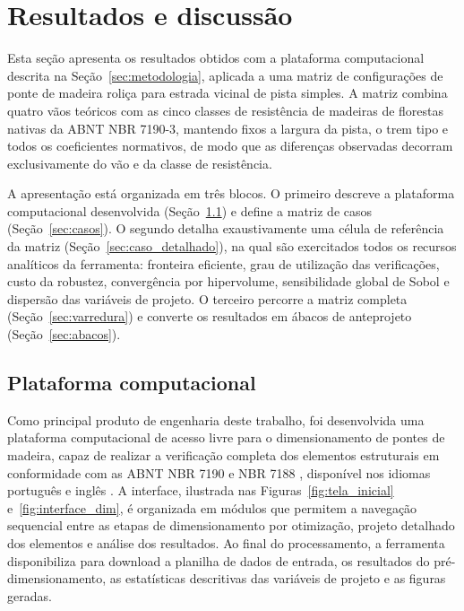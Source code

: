 \section{Resultados e discussão}\label{sec:resultados}

Esta seção apresenta os resultados obtidos com a plataforma computacional descrita na Seção~\ref{sec:metodologia}, aplicada a uma matriz de configurações de ponte de madeira roliça para estrada vicinal de pista simples.
A matriz combina quatro vãos teóricos com as cinco classes de resistência de madeiras de florestas nativas da ABNT NBR 7190-3, mantendo fixos a largura da pista, o trem tipo e todos os coeficientes normativos, de modo que as diferenças observadas decorram exclusivamente do vão e da classe de resistência.

A apresentação está organizada em três blocos.
O primeiro descreve a plataforma computacional desenvolvida (Seção~\ref{sec:plataforma}) e define a matriz de casos (Seção~\ref{sec:casos}).
O segundo detalha exaustivamente uma célula de referência da matriz (Seção~\ref{sec:caso_detalhado}), na qual são exercitados todos os recursos analíticos da ferramenta: fronteira eficiente, grau de utilização das verificações, custo da robustez, convergência por hipervolume, sensibilidade global de Sobol e dispersão das variáveis de projeto.
O terceiro percorre a matriz completa (Seção~\ref{sec:varredura}) e converte os resultados em ábacos de anteprojeto (Seção~\ref{sec:abacos}).


\subsection{Plataforma computacional}\label{sec:plataforma}

Como principal produto de engenharia deste trabalho, foi desenvolvida uma plataforma computacional de acesso livre para o dimensionamento de pontes de madeira, capaz de realizar a verificação completa dos elementos estruturais em conformidade com as ABNT NBR 7190 \parencite{NBR7190-1:2022} e NBR 7188 \parencite{nbr7188}, disponível nos idiomas português e inglês \parencite{ReliaBridge2026}.
A interface, ilustrada nas Figuras~\ref{fig:tela_inicial} e~\ref{fig:interface_dim}, é organizada em módulos que permitem a navegação sequencial entre as etapas de dimensionamento por otimização, projeto detalhado dos elementos e análise dos resultados.
Ao final do processamento, a ferramenta disponibiliza para download a planilha de dados de entrada, os resultados do pré-dimensionamento, as estatísticas descritivas das variáveis de projeto e as figuras geradas.

